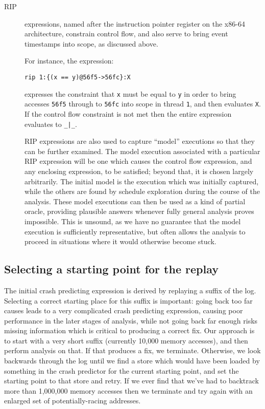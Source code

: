 \documentclass[10pt,a4paper,twocolumn]{article}
\begin{document}
\begin{description}
\item[RIP] expressions, named after the instruction pointer register
  on the x86-64 architecture, constrain control flow, and also serve
  to bring event timestamps into scope, as discussed above.

  For instance, the expression:

\begin{verbatim}
rip 1:{(x == y)@56f5->56fc}:X
\end{verbatim}

  expresses the constraint that \verb|x| must be equal to \verb|y| in
  order to bring accesses \verb|56f5| through to \verb|56fc| into
  scope in thread \verb|1|, and then evaluates \verb|X|.  If the
  control flow constraint is not met then the entire expression
  evaluates to \verb^_|_^.

  RIP expressions are also used to capture ``model'' executions so
  that they can be further examined.  The model execution associated
  with a particular RIP expression will be one which causes the
  control flow expression, and any enclosing expression, to be
  satisfied; beyond that, it is chosen largely arbitrarily.  The
  initial model is the execution which was initially captured, while
  the others are found by schedule exploration during the course of
  the analysis.  These model executions can then be used as a kind of
  partial oracle, providing plausible answers whenever fully general
  analysis proves impossible.  This is unsound, as we have no
  guarantee that the model execution is sufficiently representative,
  but often allows the analysis to proceed in situations where it
  would otherwise become stuck.

\end{description}

\subsection{Selecting a starting point for the replay}

The initial crash predicting expression is derived by replaying a
suffix of the log.  Selecting a correct starting place for this suffix
is important: going back too far causes leads to a very complicated
crash predicting expression, causing poor performance in the later
stages of analysis, while not going back far enough risks missing
information which is critical to producing a correct fix.  Our
approach is to start with a very short suffix (currently 10,000 memory
accesses), and then perform analysis on that.  If that produces a fix,
we terminate.  Otherwise, we look backwards through the log until we
find a store which would have been loaded by something in the crash
predictor for the current starting point, and set the starting point
to that store and retry.  If we ever find that we've had to backtrack
more than 1,000,000 memory accesses then we terminate and try again
with an enlarged set of potentially-racing addresses.
\end{document}
